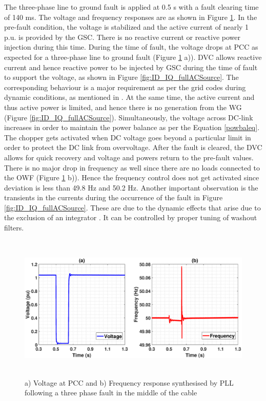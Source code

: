 The three-phase line to ground fault is applied at 0.5 s with a fault clearing time of 140 ms. The voltage and frequency responses are as shown in Figure \ref{fig:Vol_Freq_3phaseSC}. In the pre-fault condition, the voltage is stabilized and the active current of nearly 1 p.u. is provided by the \gls{GSC}. There is no reactive current or reactive power injection during this time. During the time of fault, the voltage drops at \gls{PCC} as expected for a three-phase line to ground fault (Figure \ref{fig:Vol_Freq_3phaseSC} a)). \gls{DVC} allows reactive current and hence reactive power to be injected by \gls{GSC} during the time of fault to support the voltage, as shown in Figure \ref{fig:ID_IQ_fullACSource}. The corresponding behaviour is a major requirement as per the grid codes during dynamic conditions, as mentioned in \cite{mohseni_review_2012}. At the same time, the active current and thus active power is limited, and hence there is no generation from the \gls{WG} (Figure \ref{fig:ID_IQ_fullACSource}). Simultaneously, the voltage across DC-link increases in order to maintain the power balance as per the Equation \ref{powbaleq}. The chopper gets activated when \gls{DC} voltage goes beyond a particular limit in order to protect the \gls{DC} link from overvoltage. After the fault is cleared, the \gls{DVC} allows for quick recovery and voltage and powers return to the pre-fault values. There is no major drop in frequency as well since there are no loads connected to the \gls{OWF} (Figure \ref{fig:Vol_Freq_3phaseSC} b)). Hence the frequency control does not get activated since deviation is less than 49.8 Hz and 50.2 Hz. Another important observation is the transients in the currents during the occurrence of the fault in Figure \ref{fig:ID_IQ_fullACSource}. These are due to the dynamic effects that arise due to the exclusion of an integrator \cite{korai_dynamic_2019}. It can be controlled by proper tuning of washout filters.

\begin{figure}[H]
\centering
\hspace*{-2cm}
    \includegraphics[height = 7cm,width = 18.5cm]{Diagrams/Chapter_3/VACP_Freq_Final_3.eps}
    \caption{a) Voltage at PCC and b) Frequency response synthesised by PLL following a three phase fault in the middle of the cable}
    \label{fig:Vol_Freq_3phaseSC}
\end{figure}



